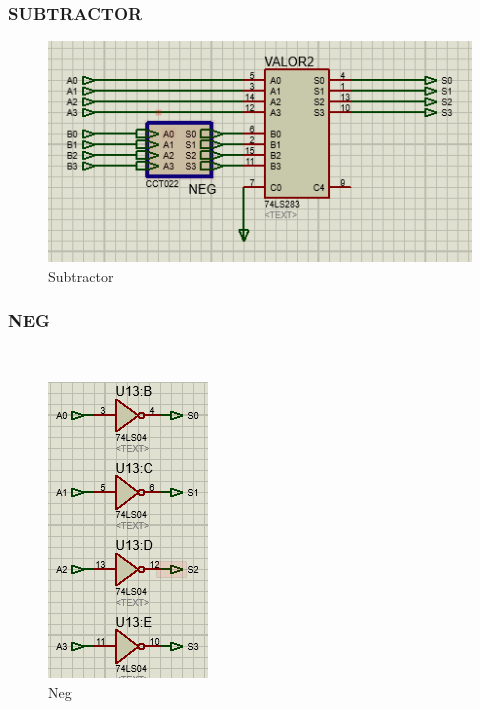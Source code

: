 \documentclass{article}
\begin{document}
\subsubsection{SUBTRACTOR}
\begin{figure}[!h]
    \centering
    \includegraphics[scale=1]{Subtractor.PNG}
    \caption{Subtractor}
    \label{fig:Subtractor}
\end{figure}

\newpage

\subsubsection{NEG} 
\begin{figure}[h]
    \centering
    \includegraphics{Neg.PNG}
    \caption{Neg}
    \label{fig:Neg}
\end{figure}
\end{document}
